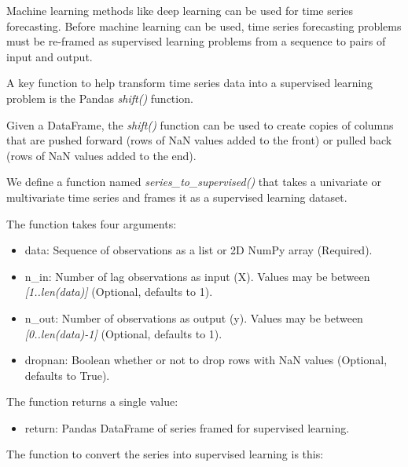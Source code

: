 \documentclass[11pt]{article}
\providecommand{\tightlist}{%
      \setlength{\itemsep}{0pt}\setlength{\parskip}{0pt}}
\begin{document}
    Machine learning methods like deep learning can be used for time series
forecasting. Before machine learning can be used, time series
forecasting problems must be re-framed as supervised learning problems
from a sequence to pairs of input and output.

    A key function to help transform time series data into a supervised
learning problem is the Pandas \emph{shift()} function.

    Given a DataFrame, the \emph{shift()} function can be used to create
copies of columns that are pushed forward (rows of NaN values added to
the front) or pulled back (rows of NaN values added to the end).

    We define a function named \emph{series\_to\_supervised()} that takes a
univariate or multivariate time series and frames it as a supervised
learning dataset.

    The function takes four arguments:

\begin{itemize}
\tightlist
\item
  data: Sequence of observations as a list or 2D NumPy array (Required).
\item
  n\_in: Number of lag observations as input (X). Values may be between
  \emph{{[}1..len(data){]}} (Optional, defaults to 1).
\item
  n\_out: Number of observations as output (y). Values may be between
  \emph{{[}0..len(data)-1{]}} (Optional, defaults to 1).
\item
  dropnan: Boolean whether or not to drop rows with NaN values
  (Optional, defaults to True).
\end{itemize}

The function returns a single value:

\begin{itemize}
\tightlist
\item
  return: Pandas DataFrame of series framed for supervised learning.
\end{itemize}

    The function to convert the series into supervised learning is this:
\end{document}
